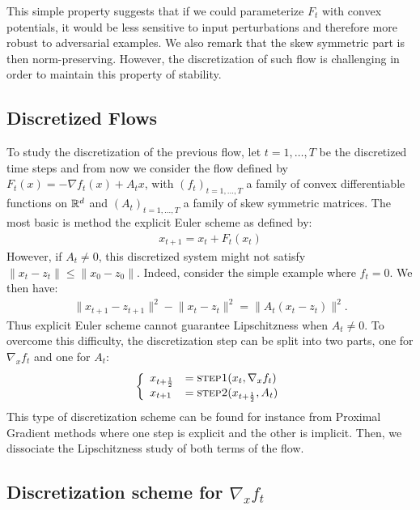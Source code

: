 This simple property suggests that if we could parameterize $F_t$  with convex potentials, it would be less sensitive to input perturbations and therefore more robust to adversarial examples. We also remark that the skew symmetric part is then norm-preserving.
However, the discretization of such flow is challenging in order to maintain this property of stability. 


\subsection{Discretized Flows}

To study the discretization of  the previous flow, let $t=1,\dots,T$ be the discretized time steps and from now we consider the flow defined by  $F_t(x) = -\nabla f_{t}(x)+A_t x$, with $(f_{t})_{t=1,\dots,T}$  a family of convex differentiable functions on $\mathbb{R}^d$ and $(A_t)_{t=1,\dots,T}$ a family of skew symmetric matrices. The most basic is method the explicit Euler scheme as defined by: 
\begin{align*}
x_{t+1} = x_t+ F_t(x_t)
\end{align*}
However, if $A_t\neq 0$, this discretized system might not satisfy $\lVert x_t-z_t\rVert\leq\lVert x_0-z_0\rVert$. Indeed, consider the simple example where $f_t=0$. We then have:
\begin{align*}
\lVert x_{t+1}-z_{t+1}\rVert^2 - \lVert x_{t}-z_{t}\rVert^2 =\lVert A_t\left(x_{t}-z_{t}\right)\rVert^2.
\end{align*}
Thus explicit Euler scheme cannot guarantee Lipschitzness when $A_t\neq 0$. To overcome this difficulty, the discretization step can be split into two parts, one for $\nabla_x f_t$ and one for $A_t$: 
\begin{align*}
   \left\{
    \begin{array}{ll}
        x_{t+\frac12} &= \textsc{step1}(x_t, \nabla_x f_t)\\
        x_{t+1}& = \textsc{step2}(x_{t+\frac12}, A_t)
    \end{array} 
    \right.
\end{align*}
This type of discretization scheme  can be found for instance from Proximal Gradient methods where one step is explicit and the other is implicit. Then, we dissociate the Lipschitzness study of both terms of the flow. 

\subsection{Discretization scheme for $\nabla_x f_t$}

